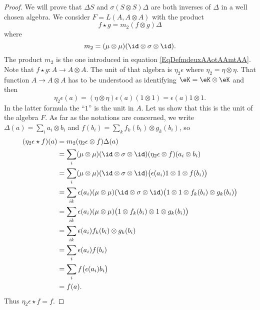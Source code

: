 \begin{proof}
    We will prove that \( \Delta S\) and \( \sigma(S\otimes S)\Delta\) are both inverses of \( \Delta\) in a well chosen algebra. We consider $F=L(A,A\otimes A)$ with the product 
    \begin{equation}
        f\star g=m_2(f\otimes g)\Delta
    \end{equation}
    where
    \begin{equation}
        m_2=(\mu\otimes\mu)(\id\otimes \sigma\otimes\id).
    \end{equation}
    The product \( m_2\) is the one introduced in equation \eqref{EqDefmdeuxAAotAAmtAA}. Note that \( f\star g\colon A\to A\otimes A\). The unit of that algebra is \( \eta_2\epsilon\) where \( \eta_2=\eta\otimes \eta\). That function \( A\to A\otimes A\) has to be understood as identifying \( \eK=\eK\otimes\eK\) and then
    \begin{equation}
        \eta_2\epsilon(a)=(\eta\otimes\eta)\epsilon(a)(1\otimes 1)=\epsilon(a)1\otimes 1.
    \end{equation}
    In the latter formula the ``\( 1\)'' is the unit in \( A\). Let us show that this is the unit of the algebra \( F\). As far as the notations are concerned, we write \( \Delta(a)=\sum_ia_i\otimes b_i\) and  \( f(b_i)=\sum_k f_k(b_i)\otimes g_k(b_i)\), so
    \begin{equation}
        \begin{aligned}[]
            (\eta_2\epsilon\star f)(a)&=m_2(\eta_2\epsilon\otimes f)\Delta(a)\\
            &=\sum_i(\mu\otimes\mu)(\id\otimes\sigma\otimes\id)(\eta_2\epsilon\otimes f)(a_i\otimes b_i)\\
            &=\sum_i(\mu\otimes\mu)(\id\otimes\sigma\otimes\id)\big( \epsilon(a_i)1\otimes 1\otimes f(b_i) \big)\\
            &=\sum_{ik}\epsilon(a_i)(\mu\otimes\mu)(\id\otimes\sigma\otimes\id)\big( 1\otimes 1\otimes f_k(b_i)\otimes g_k(b_i) \big)\\
            &=\sum_{ik}\epsilon(a_i)(\mu\otimes\mu)\big( 1\otimes f_k(b_i)\otimes 1\otimes g_k(b_i) \big)\\
            &=\sum_{ik}\epsilon(a_i)f_k(b_i)\otimes g_k(b_i)\\
            &=\sum_i\epsilon(a_i)f(b_i)\\
            &=\sum_if\big( \epsilon(a_i)b_i\big)\\
            &=f(a).
        \end{aligned}
    \end{equation}
    Thus \( \eta_2\epsilon\star f=f\).


\end{proof}

